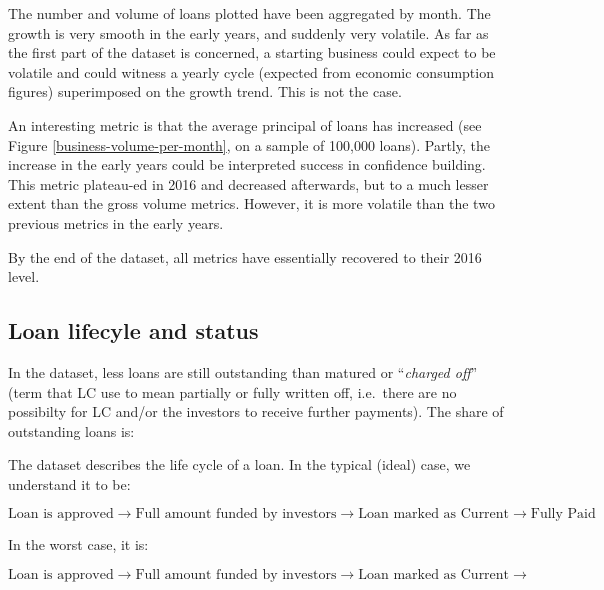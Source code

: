\documentclass[11pt,]{report}
\newenvironment{Shaded}{\begin{snugshade}}{\end{snugshade}}
\newcommand{\NormalTok}[1]{#1}
\begin{document}
The number and volume of loans plotted have been aggregated by month. The growth is very smooth in the early years, and suddenly very volatile. As far as the first part of the dataset is concerned, a starting business could expect to be volatile and could witness a yearly cycle (expected from economic consumption figures) superimposed on the growth trend. This is not the case.

An interesting metric is that the average principal of loans has increased (see Figure \ref{business-volume-per-month}, on a sample of 100,000 loans). Partly, the increase in the early years could be interpreted success in confidence building. This metric plateau-ed in 2016 and decreased afterwards, but to a much lesser extent than the gross volume metrics. However, it is more volatile than the two previous metrics in the early years.

By the end of the dataset, all metrics have essentially recovered to their 2016 level.

\hypertarget{loan-lifecyle-and-status}{%
\subsection{Loan lifecyle and status}\label{loan-lifecyle-and-status}}

In the dataset, less loans are still outstanding than matured or ``\emph{charged off}'' (term that LC use to mean partially or fully written off, i.e.~there are no possibilty for LC and/or the investors to receive further payments). The share of outstanding loans is:

\small

\begin{Shaded}
\end{Shaded}

\normalsize

The dataset describes the life cycle of a loan. In the typical (ideal) case, we understand it to be:

\[ 
\text{Loan is approved}  \rightarrow  \text{Full amount funded by investors} \rightarrow \text{Loan marked as Current} \rightarrow \text{Fully Paid}
\]

In the worst case, it is:

\[ 
\text{Loan is approved}  \rightarrow  \text{Full amount funded by investors} \rightarrow \text{Loan marked as Current} \rightarrow 
\]
\end{document}

